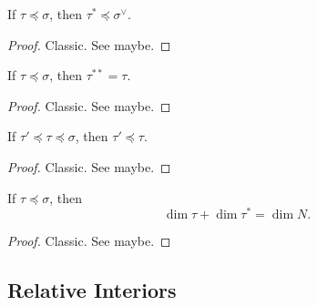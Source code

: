 \begin{proposition}
  \label{1-2-10-dual-face-face-dual}

  If $\tau \preceq \sigma$, then $\tau^* \preceq \sigma^\vee$.
\end{proposition}
\begin{proof}
  \uses{}

  Classic. See \cite{Oda_1988} maybe.
\end{proof}


\begin{proposition}
  \label{1-2-10-double-dual-face-dual-face}

  If $\tau \preceq \sigma$, then $\tau^{**} = \tau$.
\end{proposition}
\begin{proof}

  Classic. See \cite{Oda_1988} maybe.
\end{proof}


\begin{proposition}
  \label{1-2-10-dual-face-antitone}

  If $\tau' \preceq \tau \preceq \sigma$, then $\tau' \preceq \tau$.
\end{proposition}
\begin{proof}
  \uses{}

  Classic. See \cite{Oda_1988} maybe.
\end{proof}


\begin{proposition}
  \label{1-2-10-dim-dual-face}

  If $\tau \preceq \sigma$, then
  $$\dim \tau + \dim \tau^* = \dim N.$$
\end{proposition}
\begin{proof}
  \uses{}

  Classic. See \cite{Oda_1988} maybe.
\end{proof}


\subsection{Relative Interiors}


